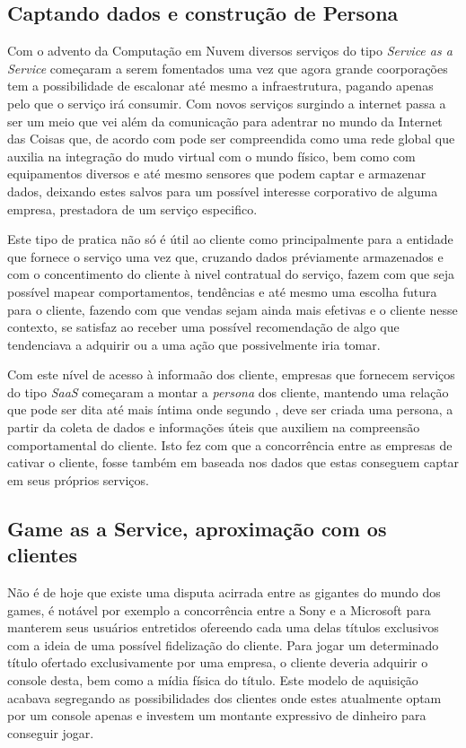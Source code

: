 \begin{justify}
    \section{Captando dados e construção de Persona}

    Com o advento da Computação em Nuvem diversos serviços do tipo \textit{Service as a Service}
    começaram a serem fomentados uma vez que agora grande coorporações tem a possibilidade de
    escalonar até mesmo a infraestrutura, pagando apenas pelo que o serviço irá consumir. Com novos
    serviços surgindo a internet passa a ser um meio que vei além da comunicação para adentrar no
    mundo da Internet das Coisas que, de acordo com \cite{albertin2017internet} pode ser
    compreendida como uma rede global que auxilia na integração do mudo virtual com o mundo físico,
    bem como com equipamentos diversos e até mesmo sensores que podem captar e armazenar dados,
    deixando estes salvos para um possível interesse corporativo de alguma empresa, prestadora de um
    serviço especifico.

    Este tipo de pratica não só é útil ao cliente como principalmente para a entidade que fornece
    o serviço uma vez que, cruzando dados préviamente armazenados e com o concentimento do cliente à
    nivel contratual do serviço, fazem com que seja possível mapear comportamentos, tendências e até
    mesmo uma escolha futura para o cliente, fazendo com que vendas sejam ainda mais efetivas e o
    cliente nesse contexto, se satisfaz ao receber uma possível recomendação de algo que tendenciava
    a adquirir ou a uma ação que possivelmente iria tomar.

    Com este nível de acesso à informaão dos cliente, empresas que fornecem serviços do tipo
    \textit{SaaS} começaram a montar a \textit{persona} dos cliente, mantendo uma relação que pode ser
    dita até mais íntima onde segundo \cite{dospersona}, deve ser criada uma persona, a partir da
    coleta de dados e informações úteis que auxiliem na compreensão comportamental do cliente. Isto
    fez com que a concorrência entre as empresas de cativar o cliente, fosse também em baseada nos
    dados que estas conseguem captar em seus próprios serviços.

    \subsection{Game as a Service, aproximação com os clientes}

    Não é de hoje que existe uma disputa acirrada entre as gigantes do mundo dos games, é notável
    por exemplo a concorrência entre a Sony e a Microsoft para manterem seus usuários entretidos
    ofereendo cada uma delas títulos exclusivos com a ideia de uma possível fidelização do
    cliente. Para jogar um determinado título ofertado exclusivamente por uma empresa, o cliente
    deveria adquirir o console desta, bem como a mídia física do título. Este modelo de aquisição
    acabava segregando as possibilidades dos clientes onde estes atualmente optam por um console
    apenas e investem um montante expressivo de dinheiro para conseguir jogar.


\end{justify}

